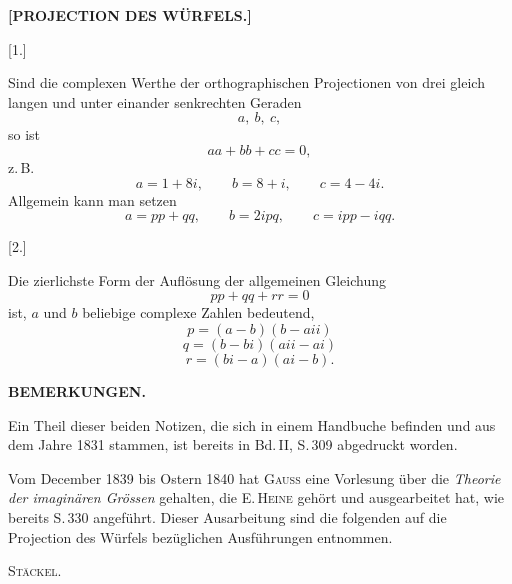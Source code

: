 \begin{center}\large\bfseries [PROJECTION DES WÜRFELS.]\end{center}

\begin{center}[1.]\end{center}

Sind die complexen Werthe der orthographischen Projectionen von drei gleich langen und unter einander senkrechten Geraden
\[
a,\ b,\ c,
\]
so ist
\[
aa+bb+cc=0,
\]
z.\,B.
\[
a=1+8i,\qquad b=8+i,\qquad c=4-4i.
\]
Allgemein kann man setzen
\[
a=pp+qq,\qquad b=2ipq,\qquad c=ipp-iqq.
\]

\begin{center}[2.]\end{center}

Die zierlichste Form der Auflösung der allgemeinen Gleichung
\[
pp+qq+rr=0
\]
ist, $a$ und $b$ beliebige complexe Zahlen bedeutend,
\[
p=(a-b)(b-aii)
\]
\[
q=(b-bi)(aii-ai)
\]
\[
r=(bi-a)(ai-b).
\]

\begin{center}\bfseries BEMERKUNGEN.\end{center}

Ein Theil dieser beiden Notizen, die sich in einem Handbuche befinden und aus dem Jahre 1831 stammen, ist bereits in Bd.\,II, S.\,309 abgedruckt worden.

\indent Vom December 1839 bis Ostern 1840 hat \textsc{Gauss} eine Vorlesung über die \emph{Theorie der imaginären Grössen} gehalten, die E.\,\textsc{Heine} gehört und ausgearbeitet hat, wie bereits S.\,330 angeführt. Dieser Ausarbeitung sind die folgenden auf die Projection des Würfels bezüglichen Ausführungen entnommen.
\par\noindent\hfill\textsc{Stäckel}.\par
